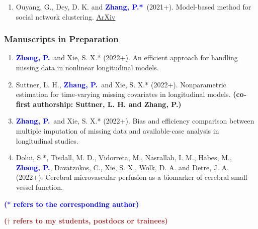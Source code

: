 \documentclass{res}
\newcommand{\PZ}{\textbf{\textcolor{blue}{Zhang, P.*}}}
\newcommand{\PZnot}{\textbf{\textcolor{blue}{Zhang, P.}}}
\begin{document}
\begin{resume}
\begin{enumerate}
	\item {\sc Ouyang, G., Dey, D. K.} and \PZ\ (2021+). 
	Model-based method for social network clustering. 
	\href{https://arxiv.org/pdf/1708.07604.pdf}{\underline{ArXiv}}
\end{enumerate}

\subsubsection{Manuscripts in Preparation}
\begin{enumerate}
	\item \PZnot\ and {\sc Xie, S. X.*} (2022+). An efficient 
	approach for handling missing data in nonlinear longitudinal
	models.	
	\item {\sc Suttner, L. H.,} \PZnot\ and {\sc Xie, S. X.*} 
	(2022+). Nonparametric estimation for time-varying missing 
	covariates in longitudinal models.  {\bf \small (co-first 
	authorship: Suttner, 
	L. H. and Zhang, P.)}
	\item \PZnot\ and {\sc Xie, S. X.*} (2022+). Bias 
	and efficiency comparison between multiple imputation of missing 
	data and available-case analysis in longitudinal studies. 
	\item {\sc Dolui, S.*, Tisdall, M. D., Vidorreta, M., 
	Nasrallah, I. M., Habes, M.}, \PZnot, {\sc 
	Davatzokos, C., Xie, S. X., Wolk, D. A.} and {\sc Detre, J. A.} 
	(2022+). Cerebral microvascular perfusion as a biomarker of 
	cerebral small vessel function.
\end{enumerate}

{\bf \textcolor{blue}{($\ast$ refers to the corresponding author)}}

{\bf \textcolor{brown}{($\dagger$ refers to my students, postdocs 
or trainees)}}


\end{resume}
\end{document}
